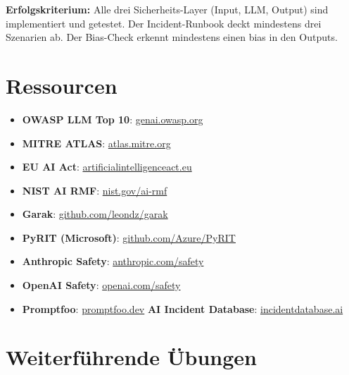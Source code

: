 \textbf{Erfolgskriterium:} Alle drei Sicherheits-Layer (Input, LLM, Output) sind implementiert und getestet. Der Incident-Runbook deckt mindestens drei Szenarien ab. Der Bias-Check erkennt mindestens einen bias in den Outputs.

\section{Ressourcen}

\begin{itemize}[leftmargin=*]
     \item \textbf{OWASP LLM Top 10}: \href{https://genai.owasp.org}{genai.owasp.org}
     \item \textbf{MITRE ATLAS}: \href{https://atlas.mitre.org}{atlas.mitre.org}
     \item \textbf{EU AI Act}: \href{https://artificialintelligenceact.eu}{artificialintelligenceact.eu}
     \item \textbf{NIST AI RMF}: \href{https://www.nist.gov/ai-rmf}{nist.gov/ai-rmf}
     \item \textbf{Garak}: \href{https://github.com/leondz/garak}{github.com/leondz/garak}
     \item \textbf{PyRIT (Microsoft)}: \href{https://github.com/Azure/PyRIT}{github.com/Azure/PyRIT}
     \item \textbf{Anthropic Safety}: \href{https://anthropic.com/safety}{anthropic.com/safety}
     \item \textbf{OpenAI Safety}: \href{https://openai.com/safety}{openai.com/safety}
     \item \textbf{Promptfoo}: \href{https://www.promptfoo.dev}{promptfoo.dev}
     \textbf{AI Incident Database}: \href{https://incidentdatabase.ai}{incidentdatabase.ai}
\end{itemize}

\section{Weiterführende Übungen}

